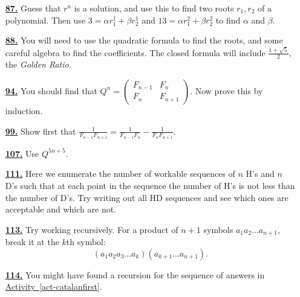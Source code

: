 \documentclass[10pt,]{book}
\theoremstyle{plain}
\theoremstyle{definition}
\theoremstyle{definition}
\theoremstyle{definition}
\numberwithin{equation}{chapter}
\newcommand{\amp}{&}
\begin{document}
\begin{itemize}[itemsep=1em]
\hypertarget{a-87}{}\item[\textbf{\hyperref[activity-87]{87.}}]
\hypertarget{p-524}{}%
Guess that \(r^n\) is a solution, and use this to find two roots \(r_1, r_2\) of a polynomial.  Then use \(3 = \alpha r_1^1 + \beta r_2^1\) and \(13 = \alpha r_1^2 + \beta r_2^2\) to find \(\alpha\) and \(\beta\).%

\hypertarget{a-88}{}\item[\textbf{\hyperref[act-binet]{88.}}]
\hypertarget{p-526}{}%
You will need to use the quadratic formula to find the roots, and some careful algebra to find the coefficients.  The closed formula will include \(\frac{1+\sqrt{5}}{2}\), the \emph{Golden Ratio}.%

\hypertarget{a-94}{}\item[\textbf{\hyperref[fib-matrix]{94.}}]
\hypertarget{p-539}{}%
You should find that \(Q^n = \begin{pmatrix}
F_{n - 1} \amp F_{n}\\
F_{n} \amp F_{n + 1}
\end{pmatrix}\).  Now prove this by induction.%

\hypertarget{a-99}{}\item[\textbf{\hyperref[activity-99]{99.}}]
\hypertarget{p-545}{}%
Show first that \(\frac{1}{F_{n - 1}F_{n + 1}} = \frac{1}{F_{n - 1}F_{n}} -
\frac{1}{F_{n}F_{n + 1}}\).%

\hypertarget{a-107}{}\item[\textbf{\hyperref[activity-107]{107.}}]
\hypertarget{p-554}{}%
Use \(Q^{5n + 5}\).%

\hypertarget{a-111}{}\item[\textbf{\hyperref[act-hdseq]{111.}}]
\hypertarget{p-563}{}%
Here we enumerate the number of workable sequences of \(n\) H's and \(n\) D's such that at each point in the sequence the number of H's is not less than the number of D's.  Try writing out all HD sequences and see which ones are acceptable and which are not.%

\hypertarget{a-113}{}\item[\textbf{\hyperref[act-parenthesize]{113.}}]
\hypertarget{p-569}{}%
Try working recursively.   For a product of \(n+1\) symbols \(a_{1}a_{2}\ldots a_{n+1}\), break it at the \(k\)th symbol:%
\begin{equation*}
(a_{1}a_{2}a_{3}\ldots a_{k})(a_{k + 1}\ldots a_{n+1}).
\end{equation*}
%

\hypertarget{a-114}{}\item[\textbf{\hyperref[act-traingulations]{114.}}]
\hypertarget{p-571}{}%
You might have found a recursion for the sequence of answers in \hyperref[act-catalanfirst]{Activity~\ref{act-catalanfirst}}.%


\end{itemize}
\end{document}
